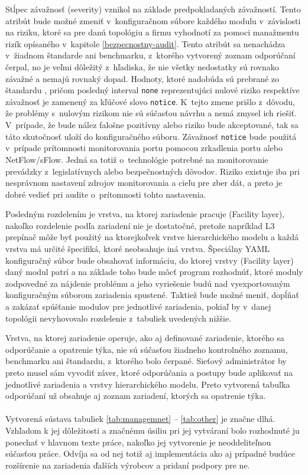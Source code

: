 Stĺpec závažnosť (severity) vznikol na základe predpokladaných závažností. Tento atribút bude možné zmeniť v~konfiguračnom súbore každého modulu v~závislosti na riziku, ktoré sa pre danú topológiu a firmu vyhodnotí za pomoci manažmentu rizík opísaného v~kapitole \ref{bezpecnostny-audit}. Tento atribút sa nenachádza v~žiadnom štandarde ani benchmarku, z~ktorého vytvorený zoznam odporúčaní čerpal, no je veľmi dôležitý z~hľadiska, že nie všetky nedostatky sú rovnako závažné a nemajú rovnaký dopad. Hodnoty, ktoré nadobúda sú prebrané zo štandardu , pričom posledný interval \texttt{none} reprezentujúci nulové riziko respektíve závažnosť je zamenený za kľúčové slovo \texttt{notice}. K~tejto zmene prišlo z~dôvodu, že problémy s~nulovým rizikom nie sú súčasťou návrhu a nemá zmysel ich riešiť. V~prípade, že bude nález falošne pozitívny alebo riziko bude akceptované, tak sa táto skutočnosť uloží do konfiguračného súboru. Závažnosť \texttt{notice} bude použitá v~prípade prítomnosti monitorovania portu pomocou zrkadlenia portu alebo NetFlow/sFlow. Jedná sa totiž o~technológie potrebné na monitorovanie prevádzky z~legislatívnych alebo bezpečnostných dôvodov. Riziko existuje iba pri nesprávnom nastavení zdrojov monitorovania a cieľu pre zber dát, a preto je dobré vedieť pri audite o~prítomnosti tohto nastavenia.
 

Posledným rozdelením je vrstva, na ktorej zariadenie pracuje (Facility layer), nakoľko rozdelenie podľa zariadení nie je dostatočné, pretože napríklad L3 prepínač môže byť použitý na ktorejkoľvek vrstve hierarchického modelu a každá vrstva má určité špecifiká, ktoré neobsahuje iná vrstva. Špeciálny YAML konfiguračný súbor bude obsahovať informáciu, do ktorej vrstvy (Facility layer) daný modul patrí a na základe toho bude môcť program rozhodnúť, ktoré moduly zodpovedné za nájdenie problému a jeho vyriešenie budú nad vyexportovaným konfiguračným súborom zariadenia spustené. Taktiež bude možné meniť, dopĺňať a zakázať spúšťanie modulov pre jednotlivé zariadenia, pokiaľ by v~danej topológii nevyhovovalo rozdelenie z~tabuliek uvedených nižšie. 

Vrstva, na ktorej zariadenie operuje, ako aj definované zariadenie, ktorého sa odporúčanie a opatrenie týka, nie sú súčasťou žiadneho kontrolného zoznamu, benchmarku ani štandardu, z~ktorého bolo čerpané. Sieťový administrátor by preto musel sám vyvodiť záver, ktoré odporúčania a postupy bude aplikovať na jednotlivé zariadenia a vrstvy hierarchického modelu. Preto vytvorená tabuľka odporúčaní už obsahuje aj zoznam zariadení, ktorých sa opatrenie týka.
\\\\
\noindent
Vytvorená sústava tabuliek \ref{tab:managemnet} -- \ref{tab:other} je značne dlhá. Vzhľadom k jej dôležitosti a značnému úsiliu pri jej vytváraní bolo rozhodnuté ju ponechať v hlavnom texte práce, nakoľko jej vytvorenie je neoddeliteľnou súčasťou práce. Odvíja sa od nej totiž aj implementácia ako aj prípadné budúce rozšírenie na zariadenia ďalších výrobcov a pridaní podpory pre ne.\\\\


